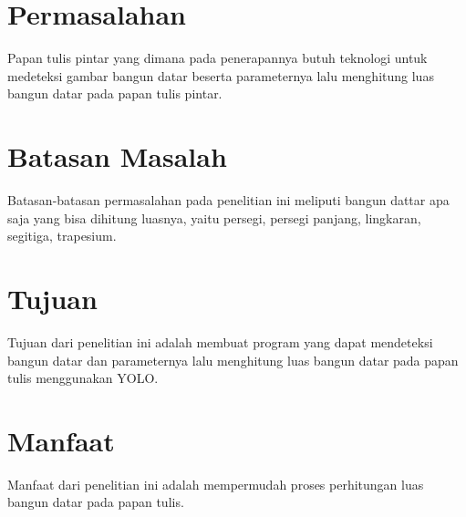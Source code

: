 \section{Permasalahan}
\label{sec:permasalahan}

Papan tulis pintar yang dimana pada penerapannya butuh teknologi untuk medeteksi gambar bangun datar beserta parameternya lalu menghitung luas bangun datar pada papan tulis pintar.

\section{Batasan Masalah}
\label{sec:batasanmasalah}

Batasan-batasan permasalahan pada penelitian ini meliputi bangun dattar apa saja yang bisa dihitung luasnya, yaitu persegi, persegi panjang, lingkaran, segitiga, trapesium.






\section{Tujuan}
\label{sec:Tujuan}

Tujuan dari penelitian ini adalah membuat program yang dapat mendeteksi bangun datar dan parameternya lalu menghitung luas bangun datar pada papan tulis menggunakan YOLO.





\section{Manfaat}
\label{sec:manfaat}

Manfaat dari penelitian ini adalah mempermudah proses perhitungan luas bangun datar pada papan tulis.

